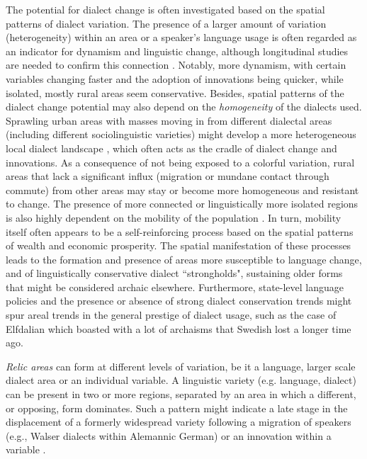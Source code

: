 \documentclass[output=paper]{langscibook}
\begin{document}
The potential for dialect change is often investigated based on the spatial patterns of dialect variation. The presence of a larger amount of variation (heterogeneity) within an area or a speaker's language usage is often regarded as an indicator for dynamism and linguistic change, although longitudinal studies are needed to confirm this connection \parencite[cf.][]{Stoeckle2016a}. 
Notably, more dynamism, with certain variables changing faster and the adoption of innovations being quicker, while isolated, mostly rural areas seem conservative.
Besides, spatial patterns of the dialect change potential may also depend on the \textit{homogeneity} of the dialects used. Sprawling urban areas with masses moving in from different dialectal areas (including different sociolinguistic varieties) might develop a more heterogeneous local dialect landscape \parencite[such as \textit{urban dialects} ---][]{Labov1966, Britain2012, Proll2019urbanareal}, which often acts as the cradle of dialect change and innovations. As a consequence of not being exposed to a colorful variation, rural areas that lack a significant influx (migration or mundane contact through commute) from other areas may stay or become more homogeneous and resistant to change.
The presence of more connected or linguistically more isolated regions is also highly dependent on the mobility of the population \parencite{Britain2013b}. In turn, mobility itself often appears to be a self-reinforcing process based on the spatial patterns of wealth and economic prosperity.
The spatial manifestation of these processes leads to the formation and presence of areas more susceptible to language change, and of linguistically conservative dialect “strongholds", sustaining older forms that might be considered archaic elsewhere.  
Furthermore, state-level language policies \parencite[e.g.,][]{Valls2013} and the presence or absence of strong dialect conservation trends might spur areal trends in the general prestige of dialect usage, such as the case of Elfdalian \parencite[cf.][]{Sapir.2005} which boasted with a lot of archaisms that Swedish lost a longer time ago.

\textit{Relic areas} can form at different levels of variation, be it a language, larger scale dialect area or an individual variable. A linguistic variety (e.g. language, dialect) can be present in two or more regions, separated by an area in which a different, or opposing, form  dominates. Such a pattern might indicate a late stage in the displacement of a formerly widespread variety following a migration of speakers (e.g., Walser dialects within Alemannic German) or an innovation within a variable \parencite[e.g.,][]{Lizana2011}.
\end{document}
